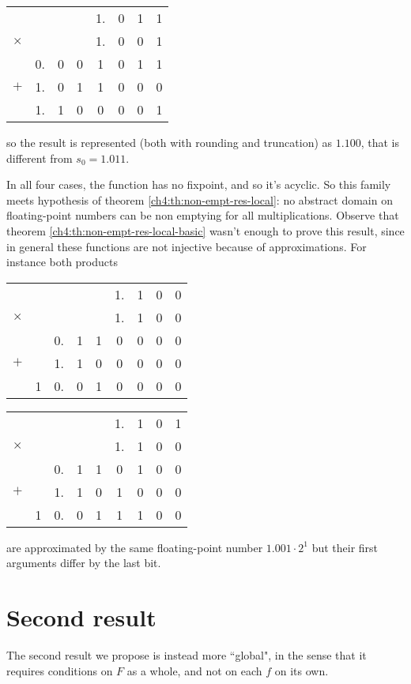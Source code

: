 \begin{example}
\begin{center}
		\begin{tabular}{c@{\;}c@{\,}c@{\,}c@{\,}c@{\,}c@{\,}c@{\,}c}
			& & & & 1. & 0 & 1 & 1 \\
			$\times$ & & & & 1. & 0 & 0 & 1 \\
			\hline
			& 0. & 0 & 0 & 1 & 0 & 1 & 1 \\
			$+$ & 1. & 0 & 1 & 1 & 0 & 0 & 0 \\
			\hline
			& 1. & 1 & 0 & 0 & 0 & 0 & 1
		\end{tabular}
	\end{center}
	so the result is represented (both with rounding and truncation) as $1.100$, that is different from $s_0 = 1.011$.

	In all four cases, the function has no fixpoint, and so it's acyclic. So this family meets hypothesis of theorem \ref{ch4:th:non-empt-res-local}: no abstract domain on floating-point numbers can be non emptying for all multiplications.
	Observe that theorem \ref{ch4:th:non-empt-res-local-basic} wasn't enough to prove this result, since in general these functions are not injective because of approximations. For instance both products
	\begin{center}
		\hfill
		\begin{tabular}{c@{\;}c@{\;}c@{\,}c@{\,}c@{\,}c@{\,}c@{\,}c@{\,}c}
			& & & & & 1. & 1 & 0 & 0 \\
			$\times$ & & & & & 1. & 1 & 0 & 0 \\
			\hline
			    & & 0. & 1 & 1 & 0 & 0 & 0 & 0\\
			$+$ & & 1. & 1 & 0 & 0 & 0 & 0 & 0 \\
			\hline
			  & 1 & 0. & 0 & 1 & 0 & 0 & 0 & 0
		\end{tabular}
		\hfill
		\begin{tabular}{c@{\;}c@{\;}c@{\,}c@{\,}c@{\,}c@{\,}c@{\,}c@{\,}c}
			& & & & & 1. & 1 & 0 & 1 \\
			$\times$ & & & & & 1. & 1 & 0 & 0 \\
			\hline
			    & & 0. & 1 & 1 & 0 & 1 & 0 & 0\\
			$+$ & & 1. & 1 & 0 & 1 & 0 & 0 & 0 \\
			\hline
			  & 1 & 0. & 0 & 1 & 1 & 1 & 0 & 0
		\end{tabular}
	\end{center}
	are approximated by the same floating-point number $1.001 \cdot 2^1$ but their first arguments differ by the last bit.
\end{example}

\section{Second result}
The second result we propose is instead more ``global", in the sense that it requires conditions on $F$ as a whole, and not on each $f$ on its own.

